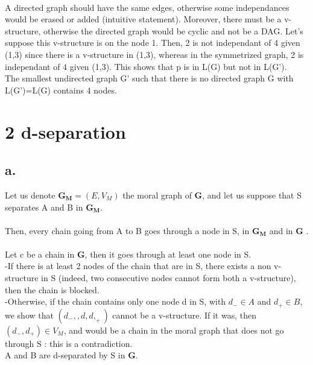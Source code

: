 \documentclass[12pt]{article}
\begin{document}

~\\
A directed graph should have the same edges, otherwise some independances would be erased or added (intuitive statement).
Moreover, there must be a v-structure, otherwise the directed graph would be cyclic and not be a DAG. Let's suppose this v-structure is on the node 1.
Then, 2 is not independant of 4 given (1,3) since there is a v-structure in (1,3), whereas in the symmetrized graph, 2 is independant of 4 given (1,3).  
This shows that p is in L(G) but not in L(G').~\\
The smallest undirected graph G' such that there is no directed graph G with L(G')=L(G) contains 4 nodes.


\section*{2 d-separation}
\subsection*{a.}
Let us denote $\mathbf{G_M}=(E, V_{M})$ the moral graph of $\mathbf{G}$, and let us suppose that S separates A and B in $\mathbf{G_M}$.~\\
~\\
Then, every chain going from A to B goes through a node in S, in $\mathbf{G_M}$ and in $\mathbf{G}$ . ~\\
Let c be a chain in $\mathbf{G}$, then it goes through at least one node in S.~\\
-If there is at least 2 nodes of the chain that are in S, there exists a non v-structure in S (indeed, two consecutive nodes cannot form both a v-structure), then the chain is blocked.~\\
-Otherwise, if the chain contains only one node d in S, with $d_{-} \in A$ and $d_{+} \in B$, we show that $(d_{-},,d,d,_{+})$ cannot be a v-structure. If it was, then $(d_{-}, d_{+}) \in V_{M}$, and would be a chain in the moral graph that does not go through S : this is a contradiction.~\\
A and B are d-separated by S in $\mathbf{G}$.
\end{document}
